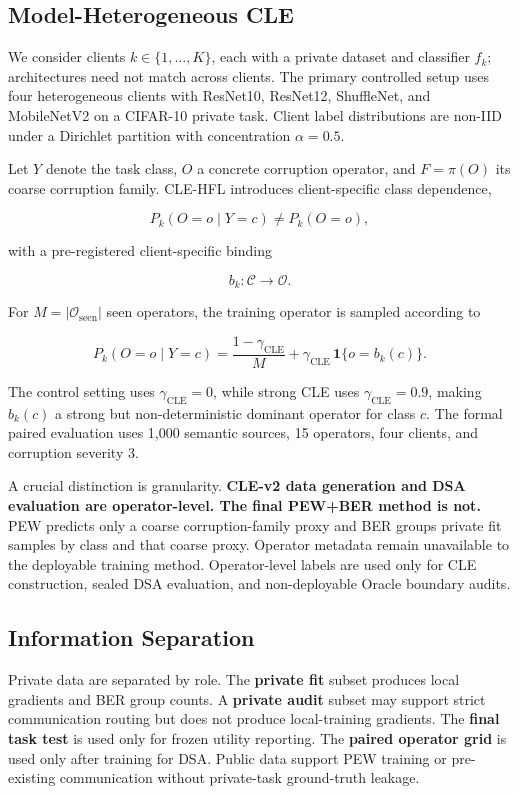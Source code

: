 \documentclass[10pt,twocolumn]{article}
\begin{document}
\subsection{Model-Heterogeneous CLE}

We consider clients \(k\in\{1,\ldots,K\}\), each with a private dataset and classifier \(f_k\); architectures need not match across clients. The primary controlled setup uses four heterogeneous clients with ResNet10, ResNet12, ShuffleNet, and MobileNetV2 on a CIFAR-10 private task. Client label distributions are non-IID under a Dirichlet partition with concentration \(\alpha=0.5\).

Let \(Y\) denote the task class, \(O\) a concrete corruption operator, and \(F=\pi(O)\) its coarse corruption family. CLE-HFL introduces client-specific class dependence,

\[
P_k(O=o\mid Y=c)\neq P_k(O=o),
\]

with a pre-registered client-specific binding

\[
b_k:\mathcal C\rightarrow\mathcal O.
\]

For \(M=|\mathcal O_{\mathrm{seen}}|\) seen operators, the training operator is sampled according to

\[
P_k(O=o\mid Y=c)
=\frac{1-\gamma_{\mathrm{CLE}}}{M}
+\gamma_{\mathrm{CLE}}\,\mathbf 1\{o=b_k(c)\}.
\]

The control setting uses \(\gamma_{\mathrm{CLE}}=0\), while strong CLE uses \(\gamma_{\mathrm{CLE}}=0.9\), making \(b_k(c)\) a strong but non-deterministic dominant operator for class \(c\). The formal paired evaluation uses 1,000 semantic sources, 15 operators, four clients, and corruption severity 3.

A crucial distinction is granularity. \textbf{CLE-v2 data generation and DSA evaluation are operator-level. The final PEW+BER method is not.} PEW predicts only a coarse corruption-family proxy and BER groups private fit samples by class and that coarse proxy. Operator metadata remain unavailable to the deployable training method. Operator-level labels are used only for CLE construction, sealed DSA evaluation, and non-deployable Oracle boundary audits.

\subsection{Information Separation}

Private data are separated by role. The \textbf{private fit} subset produces local gradients and BER group counts. A \textbf{private audit} subset may support strict communication routing but does not produce local-training gradients. The \textbf{final task test} is used only for frozen utility reporting. The \textbf{paired operator grid} is used only after training for DSA. Public data support PEW training or pre-existing communication without private-task ground-truth leakage.
\end{document}
